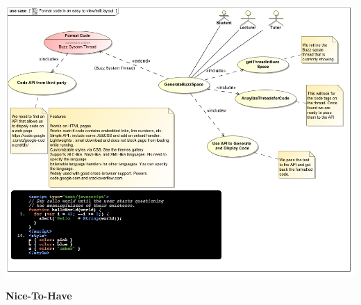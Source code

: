 \documentclass[a4paper,12pt]{report}
\begin{document}
\begin{itemize}
	\begin{center}
  	\includegraphics[width=1\textwidth]		{../Functional_Requirements_DIagrams/UseCases/UseCase_FormatCode.jpg}\\[0.4cm]    
	\end{center}
\end{itemize}
\textbf{Nice-To-Have} 
\end{document}
